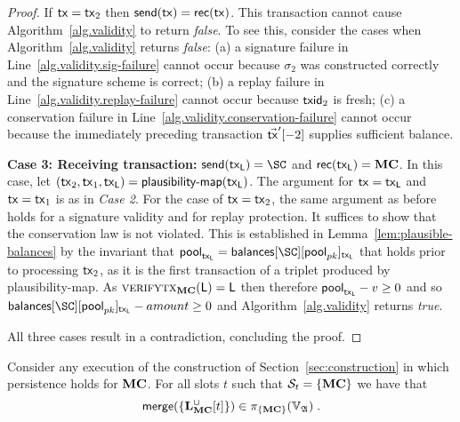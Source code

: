 \begin{proof}
  If $\mathsf{tx} = \mathsf{tx}_2$ then $\mathsf{send}(\mathsf{tx}) = \mathsf{rec}(\mathsf{tx})$. This transaction cannot cause
  Algorithm~\ref{alg.validity} to return \emph{false}. To see this, consider the
  cases when Algorithm~\ref{alg.validity} returns \emph{false}: (a) a signature
  failure in Line~\ref{alg.validity.sig-failure} cannot occur because $\sigma_2$
  was constructed correctly and the signature scheme is correct; (b) a replay
  failure in Line~\ref{alg.validity.replay-failure} cannot occur because
  $\mathsf{txid}_2$ is fresh; (c) a conservation failure in
  Line~\ref{alg.validity.conservation-failure} cannot occur because the
  immediately preceding transaction $\vec{\mathsf{tx}}'[-2]$ supplies sufficient balance.

  \textbf{Case 3: Receiving transaction:} $\send(\tx_{\LState}) = \SC$ and
  $\mathsf{rec}(\mathsf{tx}_{\mathsf{L}}) = \mathbf{MC}$. In this case, let
  $(\mathsf{tx}_2, \mathsf{tx}_1, \mathsf{tx}_{\mathsf{L}}) = \textsf{plausibility-map}(\mathsf{tx}_{\mathsf{L}})$.
  The argument for $\mathsf{tx} = \mathsf{tx}_{\mathsf{L}}$ and $\mathsf{tx} = \mathsf{tx}_1$ is as in \emph{Case 2}. For
  the case of $\mathsf{tx} = \mathsf{tx}_2$, the same argument as before holds for a signature
  validity and for replay protection. It suffices to show that the conservation
  law is not violated. This is established in Lemma~\ref{lem:plausible-balances}
  by the invariant that $\textsf{pool}_{\tx_{\LState}} =
  \textsf{balances}[\SC][\textsf{pool}_{pk}]_{\tx_{\LState}}$ that holds prior to
  processing $\mathsf{tx}_2$, as it is the first transaction of a triplet produced by
  \textsf{plausibility-map}. As $\textsc{verifytx}_{\mathbf{MC}}(\mathsf{L}) =
  \mathsf{L}$ then therefore $\textsf{pool}_{\mathsf{tx}_{\mathsf{L}}} - v \geq 0$
  and so $\textsf{balances}[\SC][\textsf{pool}_{pk}]_{\tx_{\LState}} - amount \geq 0$
  and Algorithm~\ref{alg.validity} returns \emph{true}.

  All three cases result in a contradiction, concluding the proof.
\end{proof}

\begin{lemma}\label{lem:catastrophe-firewall}
  Consider any execution of the construction of Section~\ref{sec:construction}
  in which persistence holds for $\mathbf{MC}$.
  For all slots $t$ such that $\mathcal{S}_t = \{\mathbf{MC}\}$
  we have that
  $$
    \mathsf{merge}(\{\mathbf{L}_{\mathbf{MC}}^\cup[t]\})
    \in
    \pi_{\{\mathbf{MC}\}}(\mathbb{V}_{\mathfrak{A}})
  \; .
  $$
\end{lemma}

